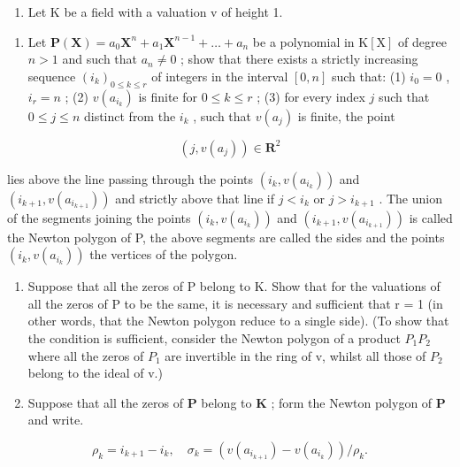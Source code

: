 \begin{enumerate}
\def\labelenumi{\arabic{enumi}.}
\setcounter{enumi}{10}
\tightlist
\item
  Let K be a field with a valuation v of height 1.
\end{enumerate}

\begin{enumerate}
\def\labelenumi{(\alph{enumi})}
\tightlist
\item
  Let \(\mathbf{P}(\mathbf{X}) = a_0\mathbf{X}^n +a_1\mathbf{X}^{n - 1} + \dots +a_n\) be a polynomial in \(\mathrm{K[X]}\) of degree \(n > 1\) and such that \(a_{n} \neq 0\) ; show that there exists a strictly increasing sequence \((i_{k})_{0 \leqslant k \leqslant r}\) of integers in the interval \([0, n]\) such that: (1) \(i_{0} = 0\) , \(i_{r} = n\) ; (2) \(v(a_{i_{k}})\) is finite for \(0 \leqslant k \leqslant r\) ; (3) for every index \(j\) such that \(0 \leqslant j \leqslant n\) distinct from the \(i_{k}\) , such that \(v(a_{j})\) is finite, the point
\end{enumerate}

\[
(j, v (a _ {j})) \in \mathbf {R} ^ {2}
\]

lies above the line passing through the points \((i_{k}, v(a_{i_{k}}))\) and \((i_{k+1}, v(a_{i_{k+1}}))\) and strictly above that line if \(j < i_{k}\) or \(j > i_{k+1}\) . The union of the segments joining the points \((i_{k}, v(a_{i_{k}}))\) and \((i_{k+1}, v(a_{i_{k+1}}))\) is called the Newton polygon of P, the above segments are called the sides and the points \((i_{k}, v(a_{i_{k}}))\) the vertices of the polygon.

\begin{enumerate}
\def\labelenumi{(\alph{enumi})}
\setcounter{enumi}{1}
\item
  Suppose that all the zeros of P belong to K. Show that for the valuations of all the zeros of P to be the same, it is necessary and sufficient that r = 1 (in other words, that the Newton polygon reduce to a single side). (To show that the condition is sufficient, consider the Newton polygon of a product \(P_{1}P_{2}\) where all the zeros of \(P_{1}\) are invertible in the ring of v, whilst all those of \(P_{2}\) belong to the ideal of v.)
\item
  Suppose that all the zeros of \(\mathbf{P}\) belong to \(\mathbf{K}\) ; form the Newton polygon of \(\mathbf{P}\) and write.
\end{enumerate}

\[
\rho_ {k} = i _ {k + 1} - i _ {k}, \quad \sigma_ {k} = (v (a _ {i _ {k + 1}}) - v (a _ {i _ {k}})) / \rho_ {k}.
\]

